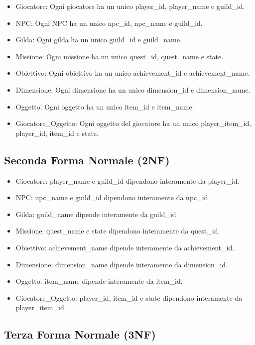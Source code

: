 \documentclass{article}
\begin{document}
\begin{itemize}
    \item Giocatore: Ogni giocatore ha un unico player\_id, player\_name e guild\_id.
    \item NPC: Ogni NPC ha un unico npc\_id, npc\_name e guild\_id.
    \item Gilda: Ogni gilda ha un unico guild\_id e guild\_name.
    \item Missione: Ogni missione ha un unico quest\_id, quest\_name e state.
    \item Obiettivo: Ogni obiettivo ha un unico achievement\_id e achievement\_name.
    \item Dimensione: Ogni dimensione ha un unico dimension\_id e dimension\_name.
    \item Oggetto: Ogni oggetto ha un unico item\_id e item\_name.
    \item Giocatore\_Oggetto: Ogni oggetto del giocatore ha un unico player\_item\_id, player\_id, item\_id e state.
\end{itemize}

\subsection{Seconda Forma Normale (2NF)}

\begin{itemize}
    \item Giocatore: player\_name e guild\_id dipendono interamente da player\_id.
    \item NPC: npc\_name e guild\_id dipendono interamente da npc\_id.
    \item Gilda: guild\_name dipende interamente da guild\_id.
    \item Missione: quest\_name e state dipendono interamente da quest\_id.
    \item Obiettivo: achievement\_name dipende interamente da achievement\_id.
    \item Dimensione: dimension\_name dipende interamente da dimension\_id.
    \item Oggetto: item\_name dipende interamente da item\_id.
    \item Giocatore\_Oggetto: player\_id, item\_id e state dipendono interamente da player\_item\_id.
\end{itemize}

\subsection{Terza Forma Normale (3NF)}
\end{document}
